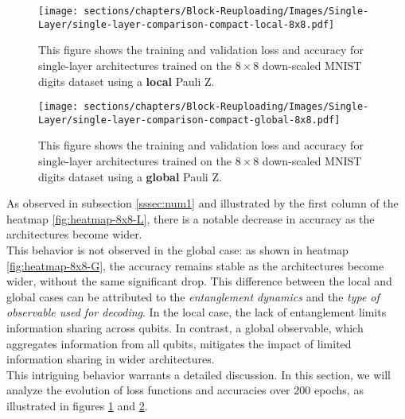 \begin{figure}[h]
    \centering
    \texttt{[image: sections/chapters/Block-Reuploading/Images/Single-Layer/single-layer-comparison-compact-local-8x8.pdf]}
    \caption{This figure shows the training and validation loss and accuracy for single-layer architectures
    trained on the $8\times8$ down-scaled MNIST digits dataset using a \textbf{local} Pauli Z.}
    \label{fig:Single-loss-local}
\end{figure}

\begin{figure}[h]
    \centering
    \texttt{[image: sections/chapters/Block-Reuploading/Images/Single-Layer/single-layer-comparison-compact-global-8x8.pdf]}
    \caption{This figure shows the training and validation loss and accuracy for single-layer architectures
    trained on the $8\times8$ down-scaled MNIST digits dataset using a \textbf{global} Pauli Z.}
    \label{fig:Single-loss-global}
\end{figure}


As observed in subsection \ref{sssec:num1} and illustrated by the first column of the heatmap 
\ref{fig:heatmap-8x8-L}, there is a notable decrease in accuracy as the architectures become wider.\\
This behavior is not observed in the global case: as shown in heatmap \ref{fig:heatmap-8x8-G}, 
the accuracy remains stable as the architectures become wider, without the same significant drop.
This difference between the local and global cases can be attributed to the \textit{entanglement dynamics} and 
the \textit{type of observable used for decoding}. 
In the local case, the lack of entanglement limits information sharing across qubits. 
In contrast, a global observable, which aggregates information from all qubits, mitigates the 
impact of limited information sharing in wider architectures.\\

This intriguing behavior warrants a detailed discussion. 
In this section, we will analyze the evolution of loss functions and accuracies over 200 epochs, 
as illustrated in figures \ref{fig:Single-loss-local} and \ref{fig:Single-loss-global}.

